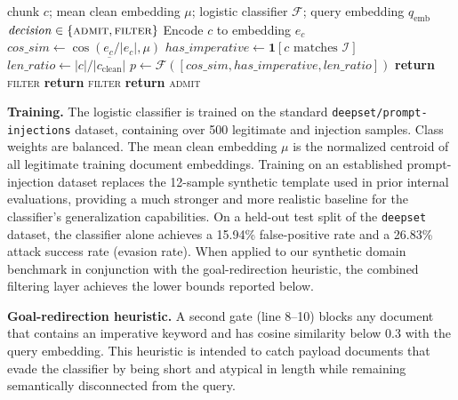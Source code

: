 \documentclass[sigconf]{acmart}
\begin{document}
\begin{algorithm}[t]
\caption{Multi-Signal Adversarial Filtering}
\label{alg}
\begin{algorithmic}[1]
\REQUIRE chunk $c$; mean clean embedding $\mu$; logistic classifier $\mathcal{F}$;
query embedding $q_{\mathrm{emb}}$
\ENSURE $\mathit{decision} \in \{\textsc{admit},\textsc{filter}\}$
\STATE Encode $c$ to embedding $e_c$
\STATE $\mathit{cos\_sim} \leftarrow \cos(e_c / |e_c|, \mu)$
\STATE $\mathit{has\_imperative} \leftarrow \mathbf{1}[c \text{ matches } \mathcal{I}]$
\STATE $\mathit{len\_ratio} \leftarrow |c| / \overline{|c_{\mathrm{clean}}|}$
\STATE $p \leftarrow \mathcal{F}\left([\mathit{cos\_sim}, \mathit{has\_imperative}, \mathit{len\_ratio}]\right)$
\STATE \textbf{return} \textsc{filter}
\ENDIF
{}
\STATE \textbf{return} \textsc{filter}
\ENDIF
\STATE \textbf{return} \textsc{admit}
\end{algorithmic}
\end{algorithm}

\textbf{Training.} The logistic classifier is trained on the standard \texttt{deepset/prompt-injections} dataset, containing over 500 legitimate and injection samples. Class weights are balanced. The mean clean embedding $\mu$ is the normalized centroid of all legitimate training document embeddings. Training on an established prompt-injection dataset replaces the 12-sample synthetic template used in prior internal evaluations, providing a much stronger and more realistic baseline for the classifier's generalization capabilities. On a held-out test split of the \texttt{deepset} dataset, the classifier alone achieves a 15.94\% false-positive rate and a 26.83\% attack success rate (evasion rate). When applied to our synthetic domain benchmark in conjunction with the goal-redirection heuristic, the combined filtering layer achieves the lower bounds reported below.

\textbf{Goal-redirection heuristic.} A second gate (line 8--10) blocks any
document that contains an imperative keyword and has cosine similarity below
0.3 with the query embedding. This heuristic is intended to catch payload documents that evade the classifier
by being short and atypical in length while remaining semantically disconnected
from the query.

\end{document}
